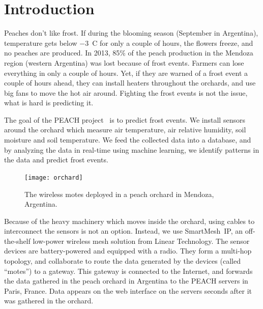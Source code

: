 \documentclass{sig-alternate}
\newcommand{\smip}                {SmartMesh~IP\xspace}
\begin{document}
\section{Introduction}
\label{sec:intro}


Peaches don't like frost.
If during the blooming season (September in Argentina), temperature gets below $-$3~C for only a couple of hours, the flowers freeze, and no peaches are produced.
In 2013, 85\% of the peach production in the Mendoza region (western Argentina) was lost because of frost events.
Farmers can lose everything in only a couple of hours.
Yet, if they are warned of a frost event a couple of hours ahead, they can install heaters throughout the orchards, and use big fans to move the hot air around.
Fighting the frost events is not the issue, what is hard is predicting it.


The goal of the PEACH project~\cite{watteyne16peach} is to predict frost events.
We install sensors around the orchard which measure air temperature, air relative humidity, soil moisture and soil temperature.
We feed the collected data into a database, and by analyzing the data in real-time using machine learning, we identify patterns in the data and predict frost events.

\begin{figure}
    \centering
    \texttt{[image: orchard]}
    \caption{The wireless motes deployed in a peach orchard in Mendoza, Argentina.}
    \label{fig:orchard}
\end{figure}


Because of the heavy machinery which moves inside the orchard, using cables to interconnect the sensors is not an option.
Instead, we use \smip, an off-the-shelf low-power wireless mesh solution from Linear Technology.
The sensor devices are battery-powered and equipped with a radio.
They form a multi-hop topology, and collaborate to route the data generated by the devices (called ``motes'') to a gateway.
This gateway is connected to the Internet, and forwards the data gathered in the peach orchard in Argentina to the PEACH servers in Paris, France.
Data appears on the web interface on the servers seconds after it was gathered in the orchard.
\end{document}
